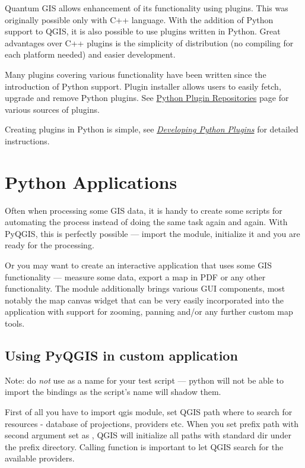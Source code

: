 \documentclass[letterpaper,10pt,english]{manual}
\begin{document}
Quantum GIS allows enhancement of its functionality using plugins. This was originally possible only with C++ language. With the addition of Python support to QGIS,
it is also possible to use plugins written in Python. Great advantages over C++ plugins is the simplicity of distribution (no compiling for each platform needed)
and easier development.

Many plugins covering various functionality have been written since the introduction of Python support. Plugin installer allows users to easily fetch, upgrade and
remove Python plugins. See \href{http://www.qgis.org/wiki/Python\_Plugin\_Repositories}{Python Plugin Repositories} page for various sources of plugins.

Creating plugins in Python is simple, see \hyperlink{plugins}{\emph{Developing Python Plugins}} for detailed instructions.


\section{Python Applications}

Often when processing some GIS data, it is handy to create some scripts for automating the process instead of doing the same task again and again.
With PyQGIS, this is perfectly possible --- import the  module, initialize it and you are ready for the processing.

Or you may want to create an interactive application that uses some GIS functionality --- measure some data, export a map in PDF or any other functionality.
The  module additionally brings various GUI components, most notably the map canvas widget that can be very easily incorporated into the
application with support for zooming, panning and/or any further custom map tools.


\subsection{Using PyQGIS in custom application}

Note: do \emph{not} use  as a name for your test script --- python will not be able to import the bindings as the script's name will shadow them.

First of all you have to import qgis module, set QGIS path where to search for resources - database of projections, providers etc.
When you set prefix path with second argument set as , QGIS will initialize all paths with standard dir under the prefix directory.
Calling  function is important to let QGIS search for the available providers.
\end{document}
